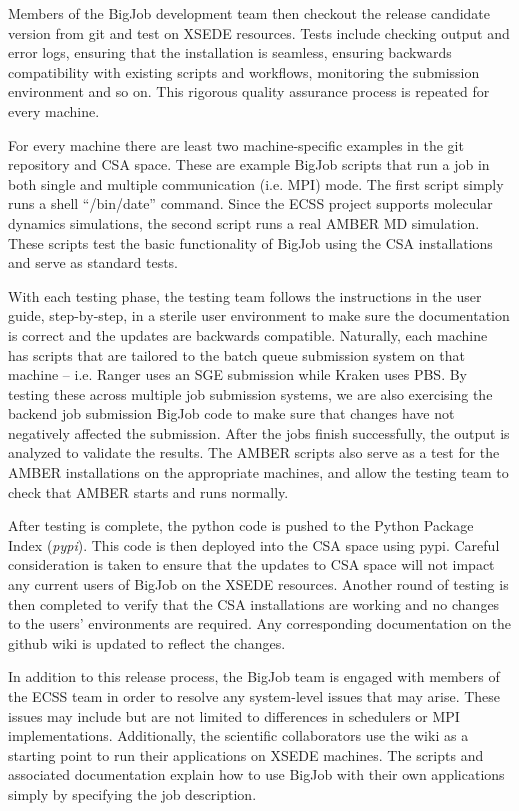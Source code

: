 \documentclass{sig-alternate}
\begin{document}
Members of the BigJob development team then checkout the release candidate
version from git and test on XSEDE resources. Tests include checking output and error logs, 
ensuring that the installation is seamless, ensuring backwards compatibility with existing 
scripts and workflows, monitoring the submission environment and so on. This rigorous quality 
assurance process is repeated for every machine.

For every machine there are least two machine-specific examples in the
git repository and CSA space. These are example BigJob scripts that
run a job in both single and multiple communication (i.e. MPI)
mode. The first script simply runs a shell ``/bin/date''
command. Since the ECSS project supports molecular dynamics
simulations, the second script runs a real AMBER MD simulation. These
scripts test the basic functionality of BigJob using the CSA
installations and serve as standard tests.

With each testing phase, the testing team follows the instructions in the user
guide, step-by-step, in a sterile user environment to make sure the
documentation is correct and the updates are backwards compatible.
Naturally, each machine has scripts that are tailored to the batch queue submission
system on that machine -- i.e. Ranger uses an SGE submission while Kraken uses
PBS. By testing these across multiple job submission systems, we are also
exercising the backend job submission BigJob code to make sure that changes have
not negatively affected the submission. After the jobs finish successfully, the
output is analyzed to validate the results. The AMBER scripts also serve as a
test for the AMBER installations on the appropriate machines, and allow the
testing team to check that AMBER starts and runs normally.

After testing is complete, the python code is pushed to the Python Package Index
(\textit{pypi}). This code is then deployed into the CSA space using pypi.
Careful consideration is taken to ensure that the updates to CSA space
will not impact any current users of BigJob on the XSEDE resources. Another round of testing 
is then completed to verify that the CSA installations are working and no changes to 
the users' environments are required. Any corresponding documentation on the 
github wiki is updated to reflect the changes.

In addition to this release process, the BigJob team is engaged with members
of the ECSS team in order to resolve any system-level issues that may arise.
These issues may include but are not limited to differences in schedulers or MPI
implementations. Additionally, the scientific collaborators use the wiki as a
starting point to run their applications on XSEDE machines. The scripts and
associated documentation explain how to use BigJob with their own applications
simply by specifying the job description. 
\end{document}
